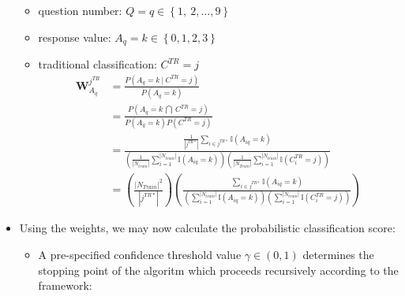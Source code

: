 \documentclass[12pt,]{article}
\providecommand{\tightlist}{%
  \setlength{\itemsep}{0pt}\setlength{\parskip}{0pt}}
\begin{document}
\begin{itemize}
  \begin{itemize}
  \tightlist
  \item
    question number: \(Q=q \in \left \{ 1, \ 2, \ldots, 9 \right \}\)
  \item
    response value: \(A_{q} = k \in \left \{ 0, 1, 2, 3 \right \}\)
  \item
    traditional classification: \(C^{TR} = j\) \begin{align*}
     \mathbf{W}_{A_{q}}^{j^{TR}} &= \frac{P\left(A_{q}=k \ \Big | \ C^{TR}= j  \right) }{P\left(A_{q}=k \right) } \tag{EQ-XX} \\[0.5em]
     &= \frac{ P\left(A_{q}=k \ \bigcap \ C^{TR}= j \right) }{P\left(A_{q}=k \right) P\left( C^{TR}= j \right)} \\[0.5em]
     &= \frac{\frac{1}{|j^{TR*}|} \sum_{i \in j^{TR*}} \mathbb{I} \left(A_{iq}=k \right)}{\left( \frac{1}{|N_{train}|}\sum_{i=1}^{|N_{train}|} \mathbb{I}\left(A_{iq}=k \right) \right) \left( \frac{1}{|N_{Train}|} \sum_{i=1}^{|N_{train}|} \mathbb{I}\left(C_{i}^{TR}=j \right) \right)  } \\[0.5em]
     &= \left(\frac{|N_{Train}|^{2}}{|j^{TR*}|} \right) \left(\frac{ \sum_{i \in j^{TR*}} \mathbb{I} \left(A_{iq}=k \right)}{\left( \sum_{i=1}^{|N_{train}|} \mathbb{I}\left(A_{iq}=k \right) \right) \left( \sum_{i=1}^{|N_{train}|} \mathbb{I}\left(C_{i}^{TR}=j \right) \right)}   \right)  
     \end{align*}
  \end{itemize}
\item
  Using the weights, we may now calculate the probabilistic
  classification score:

  \begin{itemize}
  \tightlist
  \item
    A pre-specified confidence threshold value \(\gamma \in (0,1)\)
    determines the stopping point of the algoritm which proceeds
    recursively according to the framework:


\end{itemize}
\end{itemize}
\end{document}
